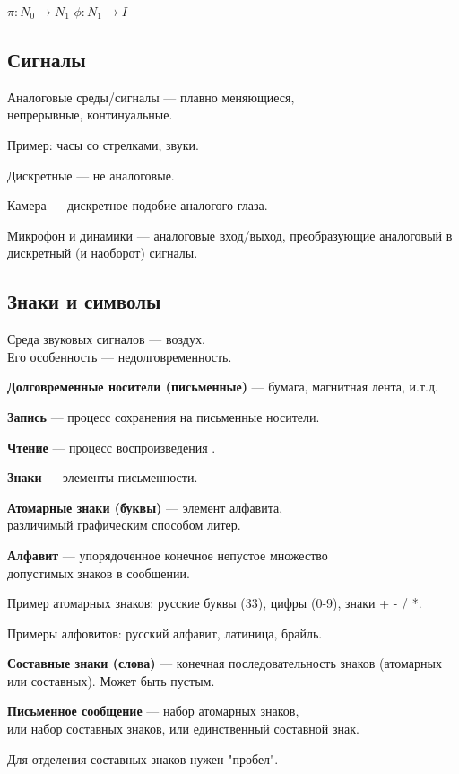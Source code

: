 \documentclass{article}
\begin{document}
$\pi: N_0 \rightarrow N_1$
$\phi: N_1 \rightarrow I$

\subsection{Сигналы}

Аналоговые среды/сигналы --- плавно меняющиеся,\\
непрерывные, континуальные.

Пример: часы со стрелками, звуки.

Дискретные --- не аналоговые.

Камера --- дискретное подобие аналогого глаза.

Микрофон и динамики --- аналоговые вход/выход, преобразующие аналоговый в дискретный (и наоборот) сигналы.

\subsection{Знаки и символы}

Среда звуковых сигналов --- воздух.\\
Его особенность --- недолговременность.

\textbf{Долговременные носители (письменные)} --- бумага, магнитная лента, и.т.д.

\textbf{Запись} --- процесс сохранения на письменные носители.

\textbf{Чтение} --- процесс воспроизведения .

\textbf{Знаки} --- элементы письменности.

\textbf{Атомарные знаки (буквы)} --- элемент алфавита,\\
различимый графическим способом литер.

\textbf{Алфавит} --- упорядоченное конечное непустое множество\\
допустимых знаков в сообщении.

Пример атомарных знаков: русские буквы (33), цифры (0-9), знаки + - / *.

Примеры алфовитов: русский алфавит, латиница, брайль.

\textbf{Составные знаки (слова)} --- конечная последовательность знаков (атомарных или составных). Может быть пустым.

\textbf{Письменное сообщение} --- набор атомарных знаков,\\
или набор составных знаков, или единственный составной знак.

Для отделения составных знаков нужен "пробел".
\end{document}
